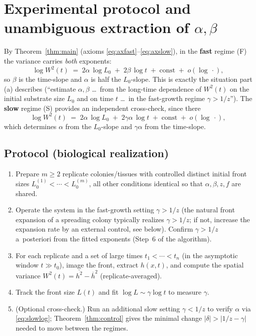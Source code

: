 \documentclass{amsart}
\theoremstyle{definition}
\begin{document}
\section{Experimental protocol and unambiguous extraction of $\alpha,\beta$}
\label{sec:protocol}

By Theorem~\ref{thm:main} (axioms \eqref{eq:axfast}--\eqref{eq:axslow}), in the
\textbf{fast} regime (F) the variance carries \emph{both} exponents:
\begin{equation}\label{eq:fastlog}
  \log W^2(t)\;=\;2\alpha\,\log L_0\;+\;2\beta\,\log t\;+\;\text{const}\;+\;o(\log\,\cdot),
\end{equation}
so $\beta$ is the time-slope and $\alpha$ is half the $L_0$-slope. This is exactly
the situation part (a) describes (``estimate $\alpha,\beta$ \dots\ from the
long-time dependence of $W^2(t)$ on the initial substrate size $L_0$ and on time
$t$ \dots\ in the fast-growth regime $\gamma>1/z$''). The \textbf{slow} regime (S)
provides an independent cross-check, since there
\begin{equation}\label{eq:slowlog}
  \log W^2(t)\;=\;2\alpha\,\log L_0\;+\;2\gamma\alpha\,\log t\;+\;\text{const}\;+\;o(\log\,\cdot),
\end{equation}
which determines $\alpha$ from the $L_0$-slope and $\gamma\alpha$ from the
time-slope.

\subsection*{Protocol (biological realization)}
\begin{enumerate}
\item Prepare $m\ge2$ replicate colonies/tissues with controlled distinct initial
  front sizes $L_0^{(1)}<\cdots<L_0^{(m)}$, all other conditions identical so that
  $\alpha,\beta,z,f$ are shared.
\item Operate the system in the fast-growth setting $\gamma>1/z$ (the natural front
  expansion of a spreading colony typically realizes $\gamma>1/z$; if not, increase
  the expansion rate by an external control, see below). Confirm $\gamma>1/z$
  a~posteriori from the fitted exponents (Step~6 of the algorithm).
\item For each replicate and a set of large times $t_1<\cdots<t_n$ (in the
  asymptotic window $t\gg t_0$), image the front, extract $h(x,t)$, and compute the
  spatial variance $W^2(t)=\overline{h^2}-\overline h^2$ (replicate-averaged).
\item Track the front size $L(t)$ and fit $\log L\sim\gamma\log t$ to measure
  $\gamma$.
\item (Optional cross-check.) Run an additional slow setting $\gamma<1/z$ to verify
  $\alpha$ via \eqref{eq:slowlog}; Theorem~\ref{thm:control} gives the minimal
  change $|\delta|>|1/z-\gamma|$ needed to move between the regimes.
\end{enumerate}
\end{document}
